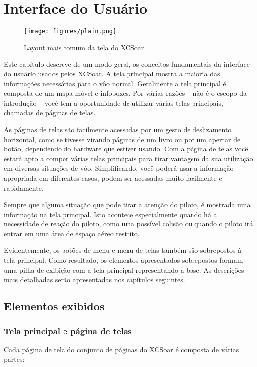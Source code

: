 \chapter{Interface do Usuário}\label{cha:interface}
\begin{figure}[h]
\texttt{[image: figures/plain.png]}
\caption{Layout mais comum da tela do XCSoar}
\end{figure}

Este capítulo descreve de um modo geral, os conceitos fundamentais da interface do usuário usados pelos XCSoar.  A tela principal mostra a maioria das informações necessárias para o vôo normal.   Geralmente a tela principal é composta de um mapa móvel e infoboxes.  Por várias razões – não é o escopo da introdução – você tem a oportunidade de utilizar várias telas principais, chamadas de páginas de telas.

As páginas de telas são facilmente acessadas por um gesto de deslizamento horizontal, como se tivesse virando páginas de um livro ou por um apertar de botão, dependendo do hardware que estiver usando.  Com a página de telas você estará apto a compor várias telas principais para tirar vantagem da sua utilização em diversas situações de vôo.  Simplificando, você poderá usar a informação apropriada em diferentes casos, podem ser acessadas muito facilmente e rapidamente.

Sempre que alguma situação que pode tirar a atenção do piloto, é mostrada uma informação na tela principal.  Isto acontece especialmente quando há a necessidade de reação do piloto, como uma possível colisão ou quando o piloto irá entrar em uma área de espaço aéreo restrito.

Evidentemente, os botões de menu e menu de telas também são sobrepostos à tela principal.  Como resultado, os elementos apresentados sobrepostos formam uma pilha de exibição com a tela principal representando a base.  As descrições mais detalhadas serão apresentadas nos capítulos seguintes. 


\section{Elementos exibidos}
\subsection*{Tela principal e página de telas}
Cada página de tela do conjunto de páginas do XCSoar é composta de várias partes:

